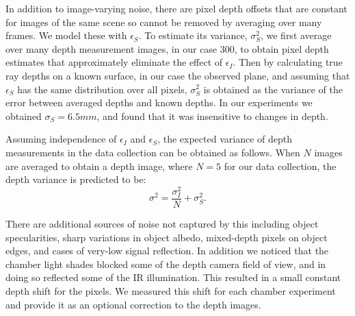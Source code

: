 In addition to image-varying noise, there are pixel depth offsets that are constant for images of the same scene so cannot be removed by averaging over many frames.  We model these with $\epsilon_S$.  To estimate its variance, $\sigma_S^2$, we first average over many depth measurement images, in our case 300, to obtain pixel depth estimates that approximately eliminate the effect of $\epsilon_I$.  Then by calculating true ray depths on a known surface, in our case the observed plane, and assuming that $\epsilon_S$ has the same distribution over all pixels, $\sigma_S^2$ is obtained as the variance of the error between averaged depths and known depths.  In our experiments we obtained $\sigma_S=6.5mm$, and found that it was insensitive to changes in depth.

Assuming independence of $\epsilon_I$ and $\epsilon_S$, the expected variance of depth measurements in the data collection can be obtained as follows.  When $N$ images are averaged to obtain a depth image, where $N=5$ for our data collection, the depth variance is predicted to be:
\begin{equation}
	\sigma^2 = \frac{\sigma_I^2}{N} + \sigma_S^2.\label{eq:sigma}
\end{equation}

There are additional sources of noise not captured by this including object specularities, sharp variations in object albedo, mixed-depth pixels on object edges, and cases of very-low signal reflection.  In addition we noticed that the chamber light shades blocked some of the depth camera field of view, and in doing so reflected some of the IR illumination.  This resulted in a small constant depth shift for the pixels.  We measured this shift for each chamber experiment and provide it as an optional correction to the depth images.



